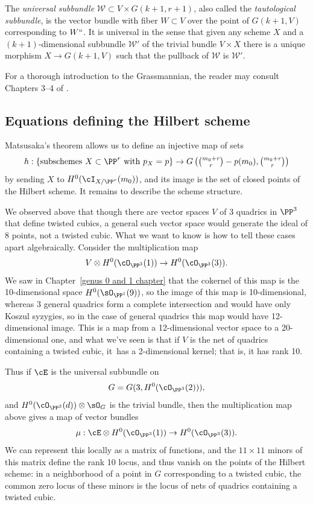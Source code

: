 \def\sW{{\mathcal W}}

The \emph{universal subbundle} $\sW \subset V\times G(k+1,r+1)$, also
%
%
called the \emph{tautological subbundle},  is
the vector bundle with fiber
%
 $W\subset V$ over the point of $G(k+1,V)$ corresponding to $W` `$. It
 is universal in the sense that
 given any scheme $X$ and a $(k+1)$-dimensional subbundle $\sW'$ of
 the trivial bundle $V\times X$
there is a unique morphism $X\to G(k+1,V)$ such that the pullback of $\sW$
is $\sW'$.

For a thorough introduction to the Grassmannian,
the reader may consult
Chapters 3--4 of
\cite{3264}.

\subsection{Equations defining the Hilbert scheme}
\label{eqns of Hilb}

Matsusaka's theorem allows us to define an injective map of sets
%
$$
h : \left\{ \text{subschemes $X \subset \PP^r$ with $p_X=p$} \right\}
\to G\left(\tbinom{m_0+r}{r} - p(m_0),\tbinom{m_0+r}{r} \right)
$$
by sending $X$ to $H^0(\cI_{X/\PP^r}(m_0))$, and its image is the set
of closed points of the Hilbert scheme.
It remains to describe the scheme structure.

We observed above that though there are vector spaces $V$ of 3 quadrics
in $\PP^{3}$ that define
twisted cubics, a general such vector space  would generate the ideal of
8 points,  not a twisted cubic. What we want to know is how to tell
these cases apart algebraically. Consider the multiplication map
$$
V \otimes H^0(\cO_{\PP^3}(1)) \to H^0(\cO_{\PP^3}(3)).
$$
We saw in Chapter~\ref{genus 0 and 1 chapter} that the cokernel of this
map is the 10-dimensional space $H^0(\sO_{\PP^1}(9))$, so the image of
this map is 10-dimensional, whereas
3 general quadrics form a complete intersection and would have only
Koszul syzygies, so
in the case of general quadrics this map would have 12-dimensional image.
This is a map from a 12-dimensional vector space to a 20-dimensional one,
and what we've seen is that if $V$ is the net of quadrics containing a
twisted cubic, it~has a 2-dimensional kernel; that is, it has rank 10.

Thus if $\cE$ is the universal subbundle on
$$G = G(3, H^0(\cO_{\PP^3}(2))),$$
and  $H^0(\cO_{\PP^3}(d))\otimes \sO_G$ is the
trivial bundle, then the multiplication map above gives a map of vector
bundles
$$
\mu: \cE \otimes H^0(\cO_{\PP^3}(1)) \to H^0(\cO_{\PP^3}(3)).
$$
We can represent this locally as a matrix of functions, and the $11\times
11$ minors of this matrix
define the rank 10 locus, and thus vanish on the points of
the Hilbert scheme: in a neighborhood of a point in $G$ corresponding
to a twisted cubic, the common zero locus of these minors is the locus
of nets of quadrics containing a twisted cubic.

